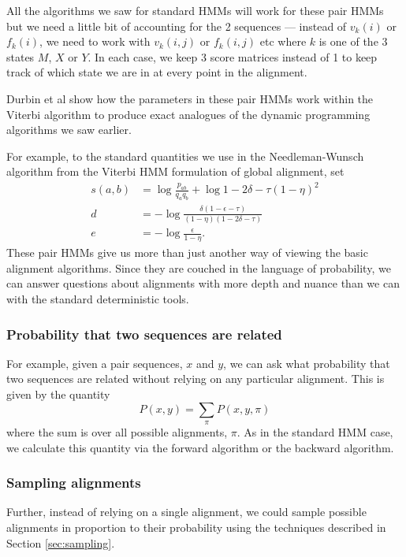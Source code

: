 \documentclass[11pt]{article}
\begin{document}
All the algorithms we saw for standard HMMs will work for these pair HMMs but we need a little bit of accounting for the 2 sequences --- instead of $v_k(i)$ or $f_k(i)$, we need to work with $v_k(i,j) $ or $f_k(i,j)$ etc where $k$ is one of the 3 states $M$, $X$ or $Y$.  In each case, we keep 3 score matrices instead of 1 to keep track of which state we are in at every  point in the alignment.

Durbin et al show how the parameters in these pair HMMs work within the Viterbi algorithm to produce exact analogues of the  dynamic programming algorithms we saw earlier.  

For example, to the standard quantities we use in the Needleman-Wunsch algorithm from the Viterbi HMM formulation of global alignment, set 
\begin{align*}
s(a,b) &= \log \frac{p_{ab}}{q_aq_b} + \log{1 - 2\delta - \tau}{(1-\eta)^2} \\
d &= -\log \frac{\delta(1-\epsilon - \tau)}{(1-\eta)(1 - 2\delta - \tau)} \\
e &= -\log \frac{\epsilon}{1-\eta}.
\end{align*}
These pair HMMs give us more than just another way of viewing the basic alignment algorithms.  Since they are couched in the language of probability, we can answer questions about alignments with more depth and nuance than we can with the standard deterministic tools.   


\newpage

\subsubsection{Probability that two sequences are related}

For example, given a pair sequences, $x$ and $y$, we can ask what probability that two sequences are related without relying on any particular alignment.  This is given by the  quantity 
\[ P(x,y) = \sum_\pi P(x,y,\pi) \]
where the sum is over all possible alignments, $\pi$.  As in the standard HMM case, we calculate this quantity via the forward algorithm or the backward algorithm.


\subsubsection{Sampling alignments}

Further, instead of relying on a single alignment, we could sample possible alignments in proportion to their probability using the techniques described in Section \ref{sec:sampling}.
\end{document}

